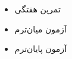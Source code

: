
\begin{itemize}
\tightlist
\item
  تمرین هفتگی
\item
  آزمون میان‌ترم
\item
  آزمون پایان‌ترم
\end{itemize}
